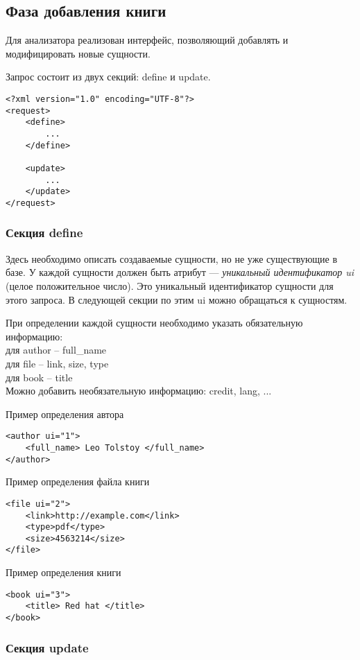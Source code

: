 \subsection{Фаза добавления книги}


Для анализатора реализован интерфейс, позволяющий добавлять и модифицировать новые сущности.

Запрос состоит из двух секций: define и update. 

\begin{verbatim}
<?xml version="1.0" encoding="UTF-8"?>
<request>
    <define>
        ...
    </define>

    <update>
        ...
    </update>
</request>
\end{verbatim}


\subsubsection{Секция define}

Здесь необходимо описать создаваемые сущности, но не уже существующие в базе. У каждой сущности должен быть атрибут --- {\em уникальный идентификатор ui} (целое положительное число). Это уникальный идентификатор сущности для этого запроса.
В следующей секции по этим ui можно обращаться к сущностям. 

При определении каждой сущности необходимо указать обязательную информацию: \\
для author -- full\_name \\
для file -- link, size, type\\
для book -- title \\


Можно добавить необязательную информацию: credit, lang, ... 

Пример определения автора 
\begin{verbatim}
<author ui="1">
    <full_name> Leo Tolstoy </full_name>
</author>
\end{verbatim}

Пример определения файла книги 
\begin{verbatim}
<file ui="2">
    <link>http://example.com</link>
    <type>pdf</type>
    <size>4563214</size>
</file>
\end{verbatim}

Пример определения книги 
\begin{verbatim}
<book ui="3">
    <title> Red hat </title>
</book>
\end{verbatim}

\subsubsection{Секция update}

